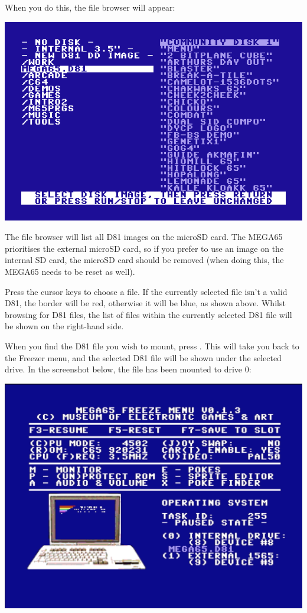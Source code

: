 When you do this, the file browser will appear:

\begin{center}
\includegraphics[trim= 10mm 20mm 10mm 20mm,clip,width=0.7\linewidth]{images/d81-file-browser.png}
\end{center}

The file browser will list all D81 images on the microSD card. The MEGA65 prioritises the external microSD card, so if you
prefer to use an image on the internal SD card, the microSD card should be removed (when doing this, the MEGA65 needs
to be reset as well).

Press the cursor keys to choose a file. If the currently selected file isn't a valid D81, the border will be red,
otherwise it will be blue, as shown above. Whilst browsing for D81 files, the list of files within the currently
selected D81 file will be shown on the right-hand side.

When you find the D81 file you wish to mount, press .
This will take you back to the Freezer menu, and the selected D81 file will be shown under the selected drive.
In the screenshot below, the   file has been mounted to drive 0:

\begin{center}
\includegraphics[trim= 10mm 20mm 10mm 20mm,clip,width=0.7\linewidth]{images/freezer-chosen-d81.png}
\end{center}

